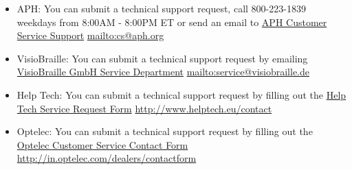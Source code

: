 \begin{itemize}[leftmargin=*]
\item APH: You can submit a technical support request, call 800-223-1839 weekdays from 8:00AM - 8:00PM ET or send an email to \href{mailto:cs@aph.org}{APH Customer Service Support}  \break\url{mailto:cs@aph.org}
\item VisioBraille: You can submit a technical support request by emailing \href{mailto:service@visiobraille.de}{VisioBraille GmbH Service Department}  \break\url{mailto:service@visiobraille.de}
\item Help Tech: You can submit a technical support request by filling out the \href{http://www.helptech.eu/contact}{Help Tech Service Request Form}  \break\url{http://www.helptech.eu/contact}
\item Optelec: You can submit a technical support request by filling out the \href{http://in.optelec.com/dealers/contactform}{Optelec Customer Service Contact Form}  \break\url{http://in.optelec.com/dealers/contactform}
\end{itemize}

